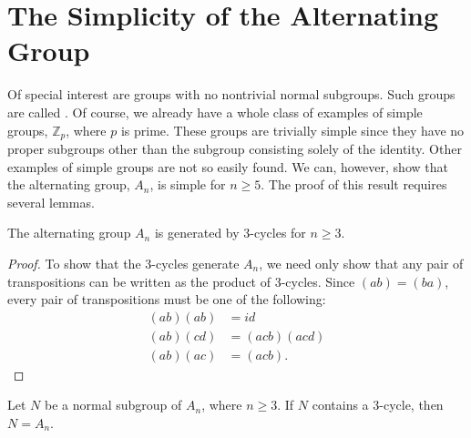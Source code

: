  
\section{The Simplicity of the Alternating Group}\label{normal:section:simplealternating}
 
 
 
 
Of special interest are groups with no nontrivial normal subgroups.
Such groups are called .  Of course, we
already have a whole class of examples of simple groups, ${\mathbb Z}_p$,
where $p$ is prime.  These groups are trivially simple since they have
no proper subgroups other than the subgroup consisting solely of the
identity. Other examples of simple groups are not so easily found.
We can, however, show that the alternating group, $A_n$, is simple for
$n \geq 5$. The proof of this result requires several lemmas. 
 
 
\begin{lemma}\label{normal:3cycle_lemma1}
The alternating group $A_n$ is generated by $3$-cycles for $n \geq 3$.
\end{lemma}
 
\begin{proof}
To show that the 3-cycles generate $A_n$, we need only show that any
pair of transpositions can be written as the product of 3-cycles.
Since $(a b) = (b a)$, every pair of transpositions must be one of the
following: 
\begin{align*}
(ab)(ab) & = id \\
(ab)(cd) & = (acb)(acd) \\
(ab)(ac) & = (acb).
\end{align*}
\end{proof}
 
 
\begin{lemma}\label{normal:3cycle_lemma2}
Let $N$ be a  normal subgroup of $A_n$, where $n \geq 3$. If $N$ 
contains a $3$-cycle, then $N = A_n$. 
\end{lemma}
 
